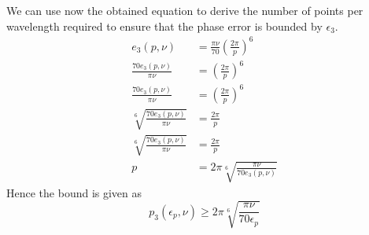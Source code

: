 We can use now the obtained equation to derive the number of points per wavelength required to ensure that the phase error is bounded by $\epsilon_3$.
\begin{equation}
	\begin{aligned}
		e_3(p, \nu)                               & = \frac{\pi \nu}{70} \left ( \frac{2\pi}{p} \right)^6 \\
		\frac{70 e_3(p, \nu)}{\pi \nu}            & =\left ( \frac{2\pi}{p} \right)^6                     \\
		\frac{70 e_3(p, \nu)}{\pi \nu}            & =\left ( \frac{2\pi}{p} \right)^6                     \\
		\sqrt[6]{\frac{70 e_3(p, \nu)}{\pi \nu} } & =  \frac{2\pi}{p}                                     \\
		\sqrt[6]{\frac{70 e_3(p, \nu)}{\pi \nu}}  & = \frac{2\pi}{p}                                      \\
		p                                         & = 2 \pi \sqrt[6]{\frac{\pi \nu}{70e_3(p, \nu)} }
	\end{aligned}
	\label{eq:bound}
\end{equation}
Hence the bound is given as
\begin{equation}
	p_3(\epsilon_p, \nu) \geq 2 \pi \sqrt[6]{\frac{\pi \nu}{70\epsilon_p} }
	\label{eq:bound_final}
\end{equation}



